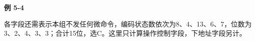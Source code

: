 {\color{ink}\bfseries 例 5-4}\par\vspace{1bp}各字段还需表示本组不发任何微命令，编码状态数依次为8、4、13、6、7，位数为3、2、4、3、3；合计15位，选C。这里只计算操作控制字段，下地址字段另计。
